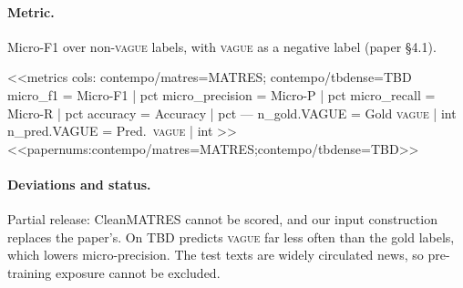 \paragraph{Metric.} Micro-F1 over non-\textsc{vague} labels, with \textsc{vague} as a negative label (paper
\S4.1).

<<metrics
cols: contempo/matres=MATRES; contempo/tbdense=TBD
micro_f1 = Micro-F1 | pct
micro_precision = Micro-P | pct
micro_recall = Micro-R | pct
accuracy = Accuracy | pct
---
n_gold.VAGUE = Gold \textsc{vague} | int
n_pred.VAGUE = Pred.\ \textsc{vague} | int
>>
<<papernums:contempo/matres=MATRES;contempo/tbdense=TBD>>

\paragraph{Deviations and status.} Partial release: CleanMATRES cannot be scored, and our input construction replaces
the paper's. On TBD \jev{} predicts \textsc{vague} far less often than the gold labels, which lowers micro-precision.
The test texts are widely circulated news, so pre-training exposure cannot be excluded.

